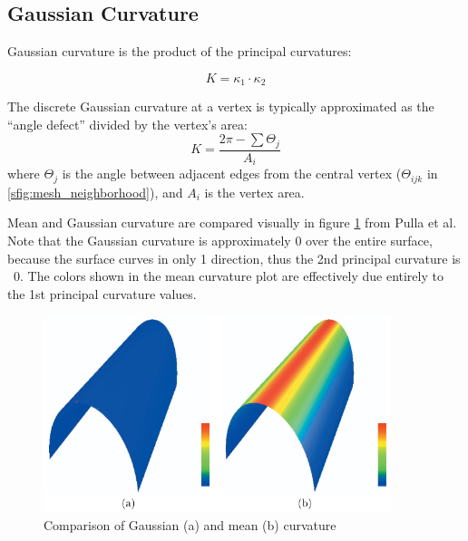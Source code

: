 \subsection{Gaussian Curvature}\label{sec:gauss_k}
Gaussian curvature\cite{TheoremaEgregium} is the product of the principal curvatures:

\begin{equation}\label{eq:gauss_k}
	K = \kappa_1 \cdot \kappa_2
\end{equation}

The discrete Gaussian curvature at a vertex is typically approximated as the ``angle defect'' divided by the vertex's area:
\begin{equation}
	K = \frac{2\pi - \sum \Theta_j}{A_i}
\end{equation}
where $\Theta_j$ is the angle between adjacent edges from the central vertex ($\Theta_{ijk}$ in \ref{sfig:mesh_neighborhood}), and $A_i$ is the vertex area.

Mean and Gaussian curvature are compared visually in figure \ref{fig:mean_gauss_k} from Pulla et al.
Note that the Gaussian curvature is approximately 0 over the entire surface, because the surface curves in only 1 direction, thus the 2nd principal curvature is ~0.
The colors shown in the mean curvature plot are effectively due entirely to the 1st principal curvature values.

\begin{figure}
	\centering
	\includegraphics[width=0.9\textwidth]{../resources/gaussian_mean_k.png}
	\caption{Comparison of Gaussian (a) and mean (b) curvature\cite{Imp_k_estimation_for_WS}}
	\label{fig:mean_gauss_k} %
\end{figure}

